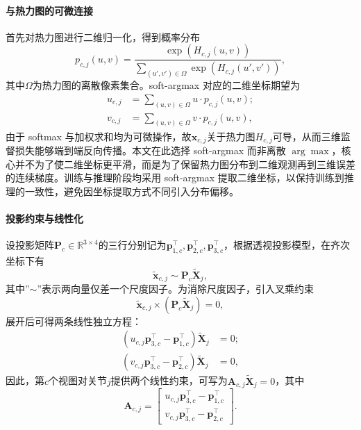 \paragraph{与热力图的可微连接}
首先对热力图进行二维归一化，得到概率分布
\begin{equation}
p_{c,j}(u,v)=\frac{\exp(H_{c,j}(u,v))}{\sum\limits_{(u',v')\in\Omega}\exp(H_{c,j}(u',v'))},
\label{eq:pdrm_softmax2d}
\end{equation}
其中$\Omega$为热力图的离散像素集合。soft-argmax 对应的二维坐标期望为
\begin{align}
u_{c,j}&=\sum\limits_{(u,v)\in\Omega} u\cdot p_{c,j}(u,v);\label{eq:pdrm_softarg_u}\\
v_{c,j}&=\sum\limits_{(u,v)\in\Omega} v\cdot p_{c,j}(u,v),
\label{eq:pdrm_softarg_v}
\end{align}
由于 softmax 与加权求和均为可微操作，故$\mathbf{x}_{c,j}$关于热力图$H_{c,j}$可导，从而三维监督损失能够端到端反向传播。本文在此选择 soft-argmax 而非离散 $\arg\max$，核心并不为了使二维坐标更平滑，而是为了保留热力图分布到二维观测再到三维误差的连续梯度。训练与推理阶段均采用 soft-argmax 提取二维坐标，以保持训练到推理的一致性，避免因坐标提取方式不同引入分布偏移。

\paragraph{投影约束与线性化}
设投影矩阵$\mathbf{P}_c\in\mathbb{R}^{3\times4}$的三行分别记为$\mathbf{p}_{1,c}^\top,\mathbf{p}_{2,c}^\top,\mathbf{p}_{3,c}^\top$，根据透视投影模型，在齐次坐标下有
\begin{equation}
\tilde{\mathbf{x}}_{c,j}\sim\mathbf{P}_c\tilde{\mathbf{X}}_j,
\label{eq:pdrm_proj}
\end{equation}
其中”$\sim$”表示两向量仅差一个尺度因子。为消除尺度因子，引入叉乘约束
\begin{equation}
\tilde{\mathbf{x}}_{c,j}\times(\mathbf{P}_c\tilde{\mathbf{X}}_j)=0,
\label{eq:pdrm_cross}
\end{equation}
展开后可得两条线性独立方程：
\begin{align}
(u_{c,j}\mathbf{p}_{3,c}^\top-\mathbf{p}_{1,c}^\top)\tilde{\mathbf{X}}_j&=0;\label{eq:pdrm_linear_u}\\
(v_{c,j}\mathbf{p}_{3,c}^\top-\mathbf{p}_{2,c}^\top)\tilde{\mathbf{X}}_j&=0,
\label{eq:pdrm_linear_v}
\end{align}
因此，第$c$个视图对关节$j$提供两个线性约束，可写为$\mathbf{A}_{c,j}\tilde{\mathbf{X}}_j=0$，其中
\begin{equation}
\mathbf{A}_{c,j}=
\begin{bmatrix}
u_{c,j}\mathbf{p}_{3,c}^\top-\mathbf{p}_{1,c}^\top\\
v_{c,j}\mathbf{p}_{3,c}^\top-\mathbf{p}_{2,c}^\top
\end{bmatrix}.
\label{eq:pdrm_Acj}
\end{equation}

